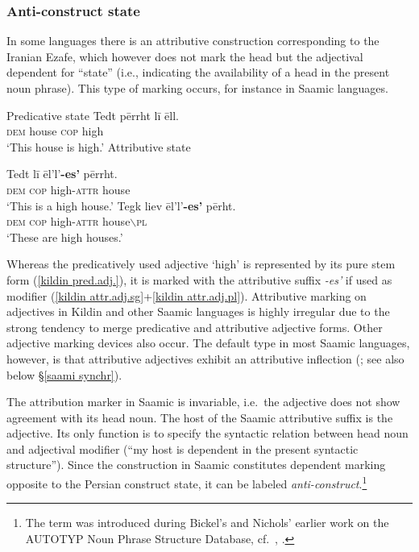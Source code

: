 \subsubsection{Anti-construct state} 
In some languages there is an attributive construction corresponding to the Iranian Ezafe, which however does not mark the head but the adjectival dependent for “state” (i.e., indicating the availability of a head in the present noun phrase). This type of marking occurs, for instance in Saamic languages.
\begin{exe}
\ex
{}
\begin{xlist}
\ex Predicative state \label{kildin pred.adj.}
\gll Tedt 	pērrht l{ī} ēll.\\
	\textsc{dem} house \textsc{cop} high\\
\glt	‘This house is high.’
\ex Attributive state
\begin{xlist}
\ex	\label{kildin attr.adj.sg}
\gll Tedt	l{ī} 	ēl'l'\textbf{-es'} 		pērrht.\\
	\textsc{dem} \textsc{cop}	high-\textsc{attr}	house\\
\glt	‘This is a high house.’
\ex	\label{kildin attr.adj.pl}
\gll Tegk 	liev 	ēl'l'\textbf{-es'}		pērht.\\	
	\textsc{dem}	\textsc{cop}	high-\textsc{attr} house$\backslash$\textsc{pl}\\
\glt	‘These are high houses.’
\end{xlist}
\end{xlist}
\end{exe}
Whereas the predicatively used adjective ‘high’ is represented by its pure stem form (\ref{kildin pred.adj.}), it is marked with the attributive suffix \textit{-es'} if used as modifier (\ref{kildin attr.adj.sg}+\ref{kildin attr.adj.pl}). Attributive marking on adjectives in Kildin and other Saamic languages is highly irregular due to the strong tendency to merge predicative and attributive adjective forms. Other adjective marking devices also occur. The default type in most Saamic languages, however, is that attributive adjectives exhibit an attributive inflection (\citealt{riesler2006b}; see also below \S\ref{saami synchr}).

The attribution marker in Saamic is invariable, i.e.~the adjective does not show agreement with its head noun. The host of the Saamic attributive suffix is the adjective. Its only function is to specify the syntactic relation between head noun and adjectival modifier (“my host is dependent in the present syntactic structure”). Since the construction in Saamic constitutes dependent marking opposite to the Persian construct state, it can be labeled \emph{anti-construct}.\footnote{The term was introduced during Bickel's and Nichols' earlier work on the AUTOTYP Noun Phrase Structure Database, cf.~\citet[2, elsewhere]{bickel-etal2002}, \citet{AUTOTYP-NP}.} 

